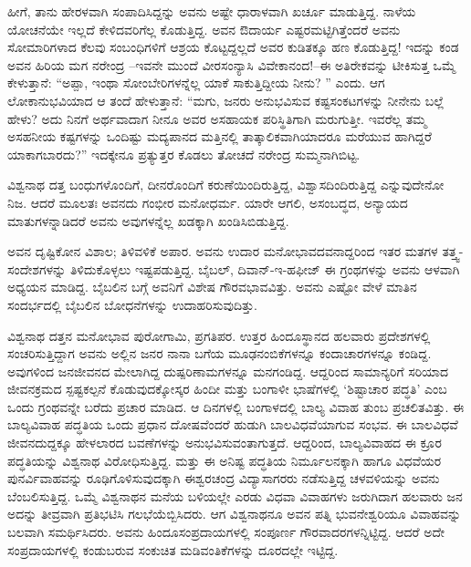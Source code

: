 ಹೀಗೆ, ತಾನು ಹೇರಳವಾಗಿ ಸಂಪಾದಿಸಿದ್ದನ್ನು ಅವನು ಅಷ್ಟೇ ಧಾರಾಳವಾಗಿ ಖರ್ಚೂ ಮಾಡುತ್ತಿದ್ದ. ನಾಳೆಯ ಯೋಚನೆಯೇ ಇಲ್ಲದೆ ಕೇಳಿದವರಿಗೆಲ್ಲ ಕೊಡುತ್ತಿದ್ದ. ಅವನ ಔದಾರ್ಯ ಎಷ್ಟರಮಟ್ಟಿಗಿತ್ತೆಂದರೆ ಅವನು ಸೋಮಾರಿಗಳಾದ ಕೆಲವು ಸಂಬಂಧಿಗಳಿಗೆ ಆಶ್ರಯ ಕೊಟ್ಟದ್ದಲ್ಲದೆ ಅವರ ಕುಡಿತಕ್ಕೂ ಹಣ ಕೊಡುತ್ತಿದ್ದ! ಇದನ್ನು ಕಂಡ ಅವನ ಹಿರಿಯ ಮಗ ನರೇಂದ್ರ –ಇವನೇ ಮುಂದೆ ವೀರಸಂನ್ಯಾಸಿ ವಿವೇಕಾನಂದ!–ಈ ಅತಿರೇಕವನ್ನು ಟೀಕಿಸುತ್ತ ಒಮ್ಮೆ ಕೇಳುತ್ತಾನೆ: “ಅಪ್ಪಾ, ಇಂಥಾ ಸೋಂಬೇರಿಗಳನ್ನೆಲ್ಲ ಯಾಕೆ ಸಾಕುತ್ತಿದ್ದೀಯ ನೀನು? ” ಎಂದು. ಆಗ ಲೋಕಾನುಭವಿಯಾದ ಆ ತಂದೆ ಹೇಳುತ್ತಾನೆ: “ಮಗು, ಜನರು ಅನುಭವಿಸುವ ಕಷ್ಟಸಂಕಟಗಳನ್ನು ನೀನೇನು ಬಲ್ಲೆ ಹೇಳು? ಅದು ನಿನಗೆ ಅರ್ಥವಾದಾಗ ನೀನೂ ಅವರ ಅಸಹಾಯಕ ಪರಿಸ್ಥಿತಿಗಾಗಿ ಮರುಗುತ್ತೀ. ಇವರೆಲ್ಲ ತಮ್ಮ ಅಸಹನೀಯ ಕಷ್ಟಗಳನ್ನು ಒಂದಿಷ್ಟು ಮದ್ಯಪಾನದ ಮತ್ತಿನಲ್ಲಿ ತಾತ್ಕಾಲಿಕವಾಗಿಯಾದರೂ ಮರೆಯುವ ಹಾಗಿದ್ದರೆ ಯಾಕಾಗಬಾರದು?” ಇದಕ್ಕೇನೂ ಪ್ರತ್ಯುತ್ತರ ಕೊಡಲು ತೋಚದೆ ನರೇಂದ್ರ ಸುಮ್ಮನಾಗಿಬಿಟ್ಟ.

ವಿಶ್ವನಾಥ ದತ್ತ ಬಂಧುಗಳೊಂದಿಗೆ, ದೀನರೊಂದಿಗೆ ಕರುಣೆಯಿಂದಿರುತ್ತಿದ್ದ, ವಿಶ್ವಾಸದಿಂದಿರುತ್ತಿದ್ದ ಎನ್ನುವುದೇನೋ ನಿಜ. ಆದರೆ ಮೂಲತಃ ಅವನದು ಗಂಭೀರ ಮನೋಧರ್ಮ. ಯಾರೇ ಆಗಲಿ, ಅಸಂಬದ್ಧದ, ಅನ್ಯಾಯದ ಮಾತುಗಳನ್ನಾಡಿದರೆ ಅವನು ಅವುಗಳನ್ನೆಲ್ಲ ಖಡಕ್ಕಾಗಿ ಖಂಡಿಸಿಬಿಡುತ್ತಿದ್ದ.

ಅವನ ದೃಷ್ಟಿಕೋನ ವಿಶಾಲ; ತಿಳಿವಳಿಕೆ ಅಪಾರ. ಅವನು ಉದಾರ ಮನೋಭಾವದವನಾದ್ದರಿಂದ ಇತರ ಮತಗಳ ತತ್ತ್ವ-ಸಂದೇಶಗಳನ್ನು ತಿಳಿದುಕೊಳ್ಳಲು ಇಷ್ಟಪಡುತ್ತಿದ್ದ. ಬೈಬಲ್, ದಿವಾನ್-ಇ-ಹಫೀಜ್ ಈ ಗ್ರಂಥಗಳನ್ನು ಅವನು ಆಳವಾಗಿ ಅಧ್ಯಯನ ಮಾಡಿದ್ದ. ಬೈಬಲಿನ ಬಗ್ಗೆ ಅವನಿಗೆ ವಿಶೇಷ ಗೌರವಭಾವವಿತ್ತು. ಅವನು ಎಷ್ಟೋ ವೇಳೆ ಮಾತಿನ ಸಂದರ್ಭದಲ್ಲಿ ಬೈಬಲಿನ ಬೋಧನೆಗಳನ್ನು ಉದಾಹರಿಸುವುದಿತ್ತು.

ವಿಶ್ವನಾಥ ದತ್ತನ ಮನೋಭಾವ ಪುರೋಗಾಮಿ, ಪ್ರಗತಿಪರ. ಉತ್ತರ ಹಿಂದೂಸ್ಥಾನದ ಹಲವಾರು ಪ್ರದೇಶಗಳಲ್ಲಿ ಸಂಚರಿಸುತ್ತಿದ್ದಾಗ ಅವನು ಅಲ್ಲಿನ ಜನರ ನಾನಾ ಬಗೆಯ ಮೂಢನಂಬಿಕೆಗಳನ್ನೂ ಕಂದಾಚಾರಗಳನ್ನೂ ಕಂಡಿದ್ದ. ಅವುಗಳಿಂದ ಜನಜೀವನದ ಮೇಲಾಗಿದ್ದ ದುಷ್ಪರಿಣಾಮಗಳನ್ನೂ ಮನಗಂಡಿದ್ದ. ಆದ್ದರಿಂದ ಸಾಮಾನ್ಯರಿಗೆ ಸರಿಯಾದ ಜೀವನಕ್ರಮದ ಸ್ಪಷ್ಟಕಲ್ಪನೆ ಕೊಡುವುದಕ್ಕೋಸ್ಕರ ಹಿಂದೀ ಮತ್ತು ಬಂಗಾಳೀ ಭಾಷೆಗಳಲ್ಲಿ ‘ಶಿಷ್ಟಾಚಾರ ಪದ್ಧತಿ’ ಎಂಬ ಒಂದು ಗ್ರಂಥವನ್ನೇ ಬರೆದು ಪ್ರಚಾರ ಮಾಡಿದ. ಆ ದಿನಗಳಲ್ಲಿ ಬಂಗಾಳದಲ್ಲಿ ಬಾಲ್ಯ ವಿವಾಹ ತುಂಬ ಪ್ರಚಲಿತವಿತ್ತು. ಈ ಬಾಲ್ಯವಿವಾಹ ಪದ್ಧತಿಯ ಒಂದು ಪ್ರಧಾನ ದೋಷವೆಂದರೆ ಹುಡುಗಿ ಬಾಲವಿಧವೆಯಾಗುವ ಸಂಭವ. ಈ ಬಾಲವಿಧವೆ ಜೀವನದುದ್ದಕ್ಕೂ ಹೇಳಲಾರದ ಬವಣೆಗಳನ್ನು ಅನುಭವಿಸುವಂತಾಗುತ್ತದೆ. ಆದ್ದರಿಂದ, ಬಾಲ್ಯವಿವಾಹದ ಈ ಕ್ರೂರ ಪದ್ಧತಿಯನ್ನು ವಿಶ್ವನಾಥ ವಿರೋಧಿಸುತ್ತಿದ್ದ. ಮತ್ತು ಈ ಅನಿಷ್ಟ ಪದ್ಧತಿಯ ನಿರ್ಮೂಲನಕ್ಕಾಗಿ ಹಾಗೂ ವಿಧವೆಯರ ಪುನರ್ವಿವಾಹವನ್ನು ರೂಢಿಗೊಳಿಸುವುದಕ್ಕಾಗಿ ಈಶ್ವರಚಂದ್ರ ವಿದ್ಯಾಸಾಗರರು ನಡೆಸುತ್ತಿದ್ದ ಚಳವಳಿಯನ್ನು ಅವನು ಬೆಂಬಲಿಸುತ್ತಿದ್ದ. ಒಮ್ಮೆ ವಿಶ್ವನಾಥನ ಮನೆಯ ಬಳಿಯಲ್ಲೇ ಎರಡು ವಿಧವಾ ವಿವಾಹಗಳು ಜರುಗಿದಾಗ ಹಲವಾರು ಜನ ಅದನ್ನು ತೀವ್ರವಾಗಿ ಪ್ರತಿಭಟಿಸಿ ಗಲಭೆಯೆಬ್ಬಿಸಿದರು. ಆಗ ವಿಶ್ವನಾಥನೂ ಅವನ ಪತ್ನಿ ಭುವನೇಶ್ವರಿಯೂ ವಿವಾಹವನ್ನು ಬಲವಾಗಿ ಸಮರ್ಥಿಸಿದರು. ಅವನು ಹಿಂದೂಸಂಪ್ರದಾಯಗಳಲ್ಲಿ ಸಂಪೂರ್ಣ ಗೌರವಾದರಗಳನ್ನಿಟ್ಟಿದ್ದ. ಆದರೆ ಅದೇ ಸಂಪ್ರದಾಯಗಳಲ್ಲಿ ಕಂಡುಬರುವ ಸಂಕುಚಿತ ಮಡಿವಂತಿಕೆಗಳನ್ನು ದೂರದಲ್ಲೇ ಇಟ್ಟಿದ್ದ.

